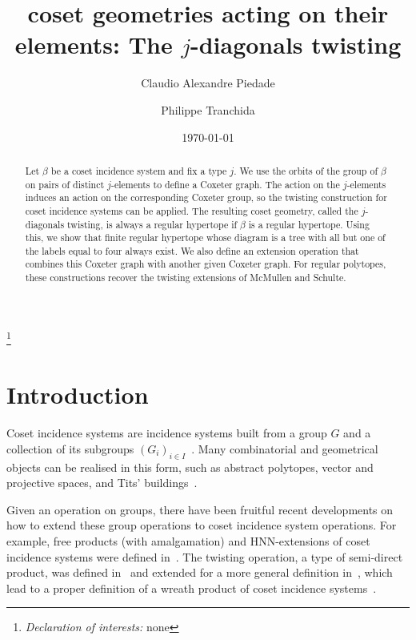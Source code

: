 \documentclass[11pt,letterpaper]{amsart}
\begin{document}
\title[The $j$-diagonals twisting]{coset geometries acting on their elements: The $j$-diagonals twisting}

\author[Claudio Alexandre Piedade]{Claudio Alexandre Piedade}
\address[Claudio Alexandre Piedade]{Universit\'e Libre de Bruxelles, Brussels, Belgium}

\author[Philippe Tranchida]{Philippe Tranchida}
\address[Philippe Tranchida]{Universit\'e Libre de Bruxelles, Brussels, Belgium}

\thanks{\textit{Declaration of interests:} none}
\date{\today}

\begin{abstract}
Let $\beta$ be a coset incidence system and fix a type $j$. We use the orbits of the group of $\beta$ on pairs of distinct $j$-elements to define a Coxeter graph. The action on the $j$-elements induces an action on the corresponding Coxeter group, so the twisting construction  for coset incidence systems can be applied. The resulting coset geometry, called the $j$-diagonals twisting, is always a regular hypertope if $\beta$ is a regular hypertope. Using this, we show that finite regular hypertope whose diagram is a tree with all but one of the labels equal to four always exist. We also define an extension operation that combines this Coxeter graph with another given Coxeter graph. For regular polytopes, these constructions recover the twisting extensions of McMullen and Schulte. 
\end{abstract}

\maketitle

\section{Introduction}


Coset incidence systems are incidence systems built from a group $G$ and a collection of its subgroups $(G_i)_{i\in I}$~\cite{Tits1957,Tits1963geometries,buekenhout2013diagram}. 
Many combinatorial and geometrical objects can be realised in this form, such as abstract polytopes, vector and projective spaces, and Tits' buildings~\cite{ARP,Handbook,Tits1974}.

Given an operation on groups, there have been fruitful recent developments on how to extend these group operations to 
coset incidence system operations. For example, free products (with amalgamation) and HNN-extensions of coset incidence systems were defined in~\cite{PiedadeTranchida_FromGroupOps2026}.
The twisting operation, a type of semi-direct product, was defined in~\cite{PiedadeTranchida_FromGroupOps2026} and extended for a more general definition in~\cite{wreath}, which lead to a proper definition of a wreath product of coset incidence systems~\cite{wreath}.
\end{document}
